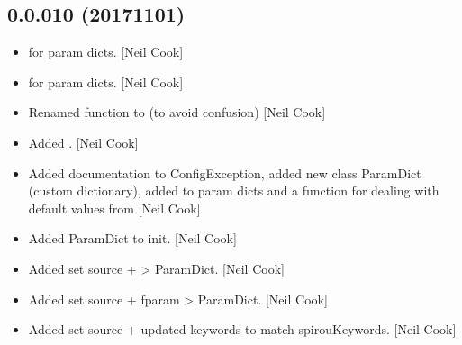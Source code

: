 \documentclass[a4paper,10pt,english]{report}
\begin{document}
\subsection{0.0.010 (2017\sphinxhyphen{}11\sphinxhyphen{}01)}
\label{\detokenize{misc/changelog:id560}}\begin{itemize}
\item {} 
 for param dicts. {[}Neil Cook{]}

\item {} 
 for param dicts. {[}Neil Cook{]}

\item {} 
Renamed  function to 
(to avoid confusion) {[}Neil Cook{]}

\item {} 
Added . {[}Neil Cook{]}

\item {} 
Added documentation to ConfigException, added new class ParamDict
(custom dictionary), added  to param dicts and a 
function for dealing with default values from  {[}Neil
Cook{]}

\item {} 
Added ParamDict to init. {[}Neil Cook{]}

\item {} 
Added set source +  \textendash{}\textgreater{} ParamDict. {[}Neil Cook{]}

\item {} 
Added set source + fparam \textendash{}\textgreater{} ParamDict. {[}Neil Cook{]}

\item {} 
Added set source + updated keywords to match spirouKeywords. {[}Neil
Cook{]}

\end{itemize}
\end{document}
